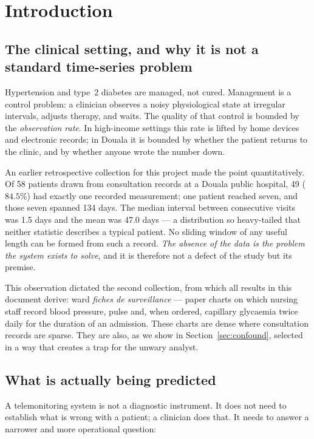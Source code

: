 \documentclass[11pt,a4paper]{article}
\begin{document}
\tableofcontents
\bigskip

\section{Introduction}

\subsection{The clinical setting, and why it is not a standard time-series problem}

Hypertension and type~2 diabetes are managed, not cured. Management is a control
problem: a clinician observes a noisy physiological state at irregular intervals,
adjusts therapy, and waits. The quality of that control is bounded by the
\emph{observation rate}. In high-income settings this rate is lifted by home
devices and electronic records; in Douala it is bounded by whether the patient
returns to the clinic, and by whether anyone wrote the number down.

An earlier retrospective collection for this project made the point quantitatively.
Of 58 patients drawn from consultation records at a Douala public hospital,
49 ($84.5\%$) had exactly one recorded measurement; one patient reached seven, and
those seven spanned 134 days. The median interval between consecutive visits was
1.5 days and the mean was 47.0 days --- a distribution so heavy-tailed that
neither statistic describes a typical patient. No sliding window of any useful
length can be formed from such a record. \emph{The absence of the data is the
problem the system exists to solve}, and it is therefore not a defect of the study
but its premise.

This observation dictated the second collection, from which all results in this
document derive: ward \emph{fiches de surveillance} --- paper charts on which
nursing staff record blood pressure, pulse and, when ordered, capillary glycaemia
twice daily for the duration of an admission. These charts are dense where
consultation records are sparse. They are also, as we show in
Section~\ref{sec:confound}, selected in a way that creates a trap for the
unwary analyst.

\subsection{What is actually being predicted}

A telemonitoring system is not a diagnostic instrument. It does not need to
establish what is wrong with a patient; a clinician does that. It needs to answer
a narrower and more operational question:
\end{document}

